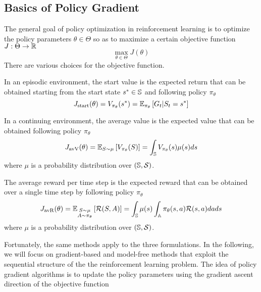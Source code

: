 \subsection{Basics of Policy Gradient}
The general goal of policy optimization in reinforcement learning is to
optimize the policy parameters $\theta \in \Theta$ so as to maximize a certain
objective function $J: \Theta \to \R$
\begin{equation}
	\max_{\theta \in \Theta} J(\theta)
\end{equation}
There are various choices for the objective function.
\begin{definition}
	In an episodic environment, the start value is the expected return that can
	be obtained starting from the start state $s^* \in \S$ and following policy
	$\pi_\theta$
	\begin{equation}
		J_{\text{start}}(\theta) = V_{\pi_\theta}(s^*) = \E[\pi_\theta]{G_t |
		   S_t = s^*}
	\end{equation}
\end{definition}
\begin{definition}
	In a continuing environment, the average value is the expected value that
	can be obtained following policy $\pi_\theta$ 
	\begin{equation}
		J_{\text{avV}}(\theta) = \E[S \sim \mu]{V_{\pi_\theta}(S)} = \int_\S
		V_{\pi_\theta}(s) \mu(s) ds
	\end{equation}
	where $\mu$ is a probability distribution over $(\S, \calS)$.
\end{definition}
\begin{definition}
	The average reward per time step is the expected reward that can be
	obtained over a single time step by following policy $\pi_\theta$ 
	\begin{equation}
		J_{\text{avR}}(\theta) = \E[\substack{S \sim \mu\\A \sim \pi_\theta}]{\calR(S,A)} 
		= \int_\S \mu(s) \int_\A \pi_\theta(s,a) \calR(s,a) da ds
	\end{equation}
	where $\mu$ is a probability distribution over $(\S, \calS)$.
\end{definition}
Fortunately, the same methods apply to the three formulations. In the
following, we will focus on gradient-based and model-free methods that exploit
the sequential structure of the the reinforcement learning problem. The idea of
policy gradient algorithms is to update the policy parameters using the
gradient ascent direction of the objective function
